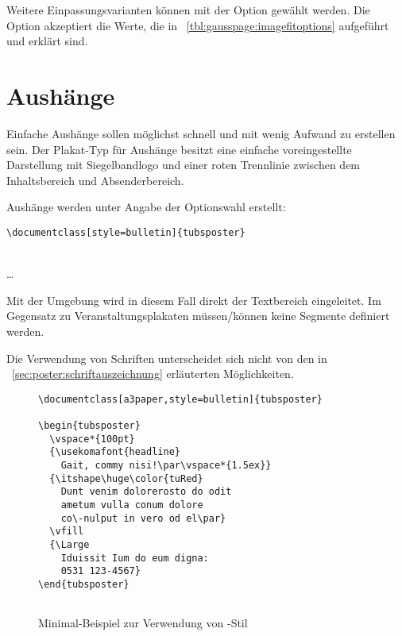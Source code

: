 Weitere Einpassungsvarianten können mit der Option 
gewählt werden.
Die Option  akzeptiert die Werte, die in
\tablename~\ref{tbl:gausspage:imagefitoptions} aufgeführt und erklärt sind.

\clearpage
\section{Aushänge}

Einfache Aushänge sollen möglichst schnell und mit wenig Aufwand zu erstellen sein.
Der Plakat-Typ für Aushänge besitzt eine einfache voreingestellte Darstellung
mit Siegelbandlogo und einer roten Trennlinie zwischen dem Inhaltsbereich
und Absenderbereich.

Aushänge werden unter Angabe der Optionswahl
 erstellt:
\begin{lstlisting}
\documentclass[style=bulletin]{tubsposter}
\end{lstlisting}

\begin{Declaration}
  \\
  \quad\dots\\
\end{Declaration}

Mit der Umgebung  wird in diesem Fall direkt
der Textbereich eingeleitet.
Im Gegensatz zu Veranstaltungsplakaten müssen/können keine Segmente 
definiert werden.

Die Verwendung von Schriften unterscheidet sich nicht von den in
\chaptername~\ref{sec:poster:schriftauszeichnung} erläuterten 
Möglichkeiten.

\begin{figure}[!ht]
\begin{minipage}{0.65\textwidth}
\begin{lstlisting}
\documentclass[a3paper,style=bulletin]{tubsposter}

\begin{tubsposter}
  \vspace*{100pt}
  {\usekomafont{headline}
    Gait, commy nisi!\par\vspace*{1.5ex}}
  {\itshape\huge\color{tuRed}
    Dunt venim dolorerosto do odit
    ametum vulla conum dolore
    co\-nulput in vero od el\par}
  \vfill
  {\Large
    Iduissit Ium do eum digna:
    0531 123-4567}
\end{tubsposter}


\end{lstlisting}
\end{minipage}
\begin{minipage}{0.35\textwidth}
\end{minipage}
\caption{Minimal-Beispiel zur Verwendung von -Stil 
  }
\end{figure}


